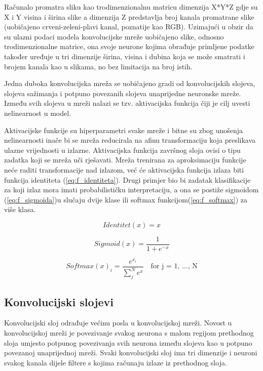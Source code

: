 \documentclass[times, utf8, proizvoljni, numeric]{fer}
\begin{document}
Računalo promatra sliku kao trodimenzionalnu matricu dimenzija X*Y*Z gdje su X i Y visina i širina slike a dimenzija Z predstavlja broj kanala promatrane slike (uobičajeno crveni-zeleni-plavi kanal, poznatije kao RGB). Uzimajući u obzir da su ulazni podaci modela konvolucijske mreže uobičajeno slike, odnosno trodimenzionalne matrice, ona svoje neurone kojima obrađuje primljene podatke također uređuje u tri dimenzije širina, visina i dubina koja se može smatrati i brojem kanala kao u slikama, no bez limitacija na broj istih.

Jedna duboka konvolucijska mreža se uobičajeno gradi od konvolucijskih slojeva, slojeva sažimanja i potpuno povezanih slojeva unaprijedne neuronske mreže. Između svih slojeva u mreži nalazi se tzv. aktivacijska funkcija čiji je cilj uvesti nelinearnost u model.

Aktivacijske funkcije su hiperparametri svake mreže i bitne su zbog unošenja nelinearnosti inače bi se mreža reducirala na afinu transformaciju koja preslikava ulazne vrijednosti u izlazne.  Aktivacijska funkcija završnog sloja ovisi o tipu zadatka koji se mreža uči rješavati. Mreža trenirana za aproksimaciju funkcije neće raditi transformacije nad izlazom, već će aktivacijska funkcija izlaza biti funkcija identiteta (\ref{eq:f_identiteta}). Drugi primjer bio bi zadatak klasifikacije za koji izlaz mora imati probabilističku interpretaciju, a ona se postiže sigmoidom (\ref{eq:f_sigmoida})u slučaju dvije klase ili softmax funkcijom(\ref{eq:f_softmax}) za više klasa. 

\begin{equation}
\label{eq:f_identiteta}
Identitet(x) = x   
\end{equation}

\begin{equation}
\label{eq:f_sigmoida}
Sigmoid(x) = \frac{1}{1+e^{-x}}    
\end{equation}

\begin{equation}
\label{eq:f_softmax}
Softmax(x)_i = \frac{e^{x_i}}{\sum_{j}^{N}e^{x}} \quad \text{for j = 1, ..., N}
\end{equation}


\subsection{Konvolucijski slojevi}


Konvolucijski sloj odrađuje većinu posla u konvolucijskoj mreži. Novost u konvolucijskoj mreži je povezivanje svakog neurona s malom regijom prethodnog sloja umjesto potpunog povezivanja svih neurona između slojeva kao u potpuno povezanoj unaprijednoj mreži. Svaki konvolucijski sloj ima tri dimenzije i neuroni svakog kanala dijele filtere s kojima računaju izlaze iz prethodnog sloja.
\end{document}
